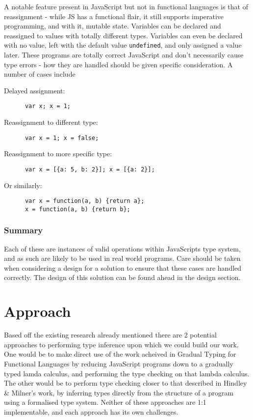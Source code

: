 \documentclass[british, twoside]{bhamthesis}
\theoremstyle{definition}
\begin{document}
    A notable feature present in JavaScript but not in functional languages is that of reassignment - while JS has a functional flair, it still supports imperative programming, and with it, mutable state. Variables can be declared and reassigned to values with totally different types. Variables can even be declared with no value, left with the default value \texttt{undefined}, and only assigned a value later. These programs are totally correct JavaScript and don't necessarily cause type errors - how they are handled should be given specific consideration. A number of cases include

    Delayed assignment:
    \begin{lstlisting}
      var x; x = 1;
    \end{lstlisting}

    Reassignment to different type:
    \begin{lstlisting}
      var x = 1; x = false;
    \end{lstlisting}

    Reassignment to more specific type:
    \begin{lstlisting}
      var x = [{a: 5, b: 2}]; x = [{a: 2}];
    \end{lstlisting}

    Or similarly:
    \begin{lstlisting}
      var x = function(a, b) {return a};
      x = function(a, b) {return b};
    \end{lstlisting}

  \subsubsection{Summary}

    Each of these are instances of valid operations within JavaScripts type system, and as such are likely to be used in real world programs. Care should be taken when considering a design for a solution to ensure that these cases are handled correctly. The design of this solution can be found ahead in the design section.

  \section{Approach}

    Based off the existing research already mentioned there are 2 potential approaches to performing type inference upon which we could build our work. One would be to make direct use of the work acheived in Gradual Typing for Functional Languages\autocite{Siek2006} by reducing JavaScript programs down to a gradually typed lamda calculus, and performing the type checking on that lambda calculus. The other would be to perform type checking closer to that described in  Hindley \& Milner's work, by inferring types directly from the structure of a program using a formalised type system. Neither of these approaches are 1:1 implementable, and each approach has its own challenges.
\end{document}
